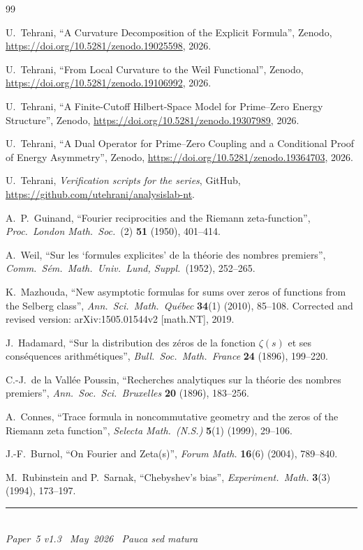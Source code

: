 \documentclass[11pt]{article}
\begin{document}
\newpage
\begin{thebibliography}{99}

U.~Tehrani,
``A Curvature Decomposition of the Explicit Formula'',
Zenodo, \url{https://doi.org/10.5281/zenodo.19025598}, 2026.

U.~Tehrani,
``From Local Curvature to the Weil Functional'',
Zenodo, \url{https://doi.org/10.5281/zenodo.19106992}, 2026.

U.~Tehrani,
``A Finite-Cutoff Hilbert-Space Model
for Prime--Zero Energy Structure'',
Zenodo, \url{https://doi.org/10.5281/zenodo.19307989}, 2026.

U.~Tehrani,
``A Dual Operator for Prime--Zero Coupling
and a Conditional Proof of Energy Asymmetry'',
Zenodo, \url{https://doi.org/10.5281/zenodo.19364703}, 2026.

U.~Tehrani,
\emph{Verification scripts for the series},
GitHub, \url{https://github.com/utehrani/analysislab-nt}.

A.~P.~Guinand,
``Fourier reciprocities and the Riemann zeta-function'',
\emph{Proc.\ London Math.\ Soc.}\ (2) \textbf{51} (1950), 401--414.

A.~Weil,
``Sur les `formules explicites' de la th\'eorie des nombres premiers'',
\emph{Comm.\ S\'em.\ Math.\ Univ.\ Lund, Suppl.}\ (1952), 252--265.

K.~Mazhouda,
``New asymptotic formulas for sums over zeros of functions
from the Selberg class'',
\emph{Ann.\ Sci.\ Math.\ Qu\'ebec} \textbf{34}(1) (2010), 85--108.
Corrected and revised version: arXiv:1505.01544v2 [math.NT], 2019.

J.~Hadamard,
``Sur la distribution des z\'eros de la fonction $\zeta(s)$
et ses cons\'equences arithm\'etiques'',
\emph{Bull.\ Soc.\ Math.\ France} \textbf{24} (1896), 199--220.

C.-J.~de la Vall\'ee Poussin,
``Recherches analytiques sur la th\'eorie des nombres premiers'',
\emph{Ann.\ Soc.\ Sci.\ Bruxelles} \textbf{20} (1896), 183--256.

A.~Connes,
``Trace formula in noncommutative geometry and the zeros
of the Riemann zeta function'',
\emph{Selecta Math.\ (N.S.)} \textbf{5}(1) (1999), 29--106.

J.-F.~Burnol,
``On Fourier and Zeta(s)'',
\emph{Forum Math.} \textbf{16}(6) (2004), 789--840.

M.~Rubinstein and P.~Sarnak,
``Chebyshev's bias'',
\emph{Experiment.\ Math.} \textbf{3}(3) (1994), 173--197.

\end{thebibliography}

\enlargethispage{3\baselineskip}
\vspace*{\fill}
\begin{minipage}{\linewidth}
\rule{\linewidth}{0.4pt}\smallskip\\
\small\emph{Paper~5 v1.3 \textperiodcentered\ May~2026
\textperiodcentered\ Pauca sed matura}
\end{minipage}
\end{document}
